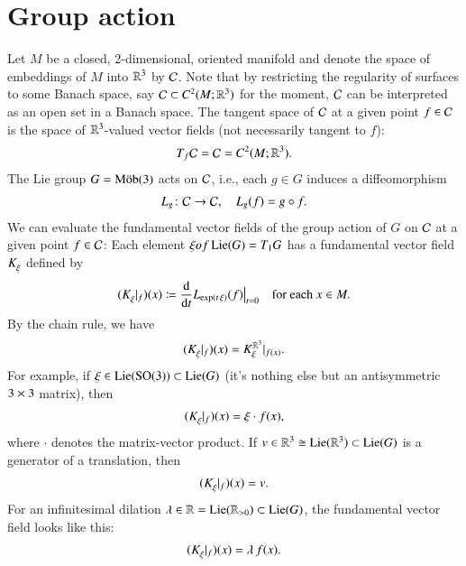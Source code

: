 
\section{Group action}\label{sec:GroupAction}

Let $M$ be a closed, 2-dimensional, oriented manifold and denote the space of embeddings of $M$ into ${{\mathbb{R}}^{3}}$ by $\mathcal{C}$. 
Note that by restricting the regularity of surfaces to some Banach space, say $\ConfSpace \subset \Holder[2][][M][\AmbSpace]$ for the moment,  $\mathcal{C}$ can be interpreted as an open set in a Banach space. The tangent space of  $\mathcal{C}$ at a given point $f \in \mathcal{C}$ is the space of ${{\mathbb{R}}^{3}}$-valued vector fields (not necessarily tangent to $f$):
\begin{align*}
	T_f \ConfSpace =  \ConfSpace  = \Holder[2][][M][\AmbSpace].
\end{align*}
The Lie group $G = \mathrm{M\ddot{o}b}(3)$ acts on $\mathcal{C}$, i.e., each $g \in G$ induces a diffeomorphism 
\begin{align*}
	L_g \colon \mathcal{C} \to \mathcal{C}, \quad L_g(f) = g \circ f.
\end{align*}
We can evaluate the fundamental vector fields of the group action of $G$ on $\mathcal{C}$ at a given point $f \in \mathcal{C}$: Each element $\xi of \operatorname{Lie}(G) = T_1 G$ has a fundamental vector field 
$\Funda[\xi]$ defined by
\begin{align*}
	(\Funda[\xi] \at_f)(x) 
	\ceq 
	\frac{\dd}{\dd t} L_{\exp(t \,\xi)}(f) \At_{t=0} 
	\quad \text{for each $x \in M.$}
\end{align*}
By the chain rule, we have
\begin{align}
	(\Funda[\xi] \at_f)(x) 
	=
	\Funda[\xi][\AmbSpace] \at_{f(x)}.
	\label{eq:Funda}
\end{align}
For example, if $\xi \in \operatorname{Lie}({\operatorname{SO}}(3)) \subset \operatorname{Lie}(G)$ (it's nothing else but an antisymmetric $3 \times 3$ matrix), then
\begin{align*}
		(\Funda[\xi] \at_f)(x) = \xi \cdot f(x),
\end{align*}
where $\cdot$ denotes the matrix-vector product.
If $v \in {{\mathbb{R}}^{3}} \cong \operatorname{Lie}({{\mathbb{R}}^{3}}) \subset \operatorname{Lie}(G)$ is a generator of a translation, then
\begin{align*}
	(\Funda[\xi] \at_f)(x)  = v.
\end{align*}
For an infinitesimal dilation $\lambda \in {\mathbb{R}} =\operatorname{Lie}({\mathbb{R}}_{>0}) \subset \operatorname{Lie}(G)$, the fundamental vector field looks like this:
\begin{align*}
		(\Funda[\xi] \at_f)(x) = \lambda \, f(x).
\end{align*}